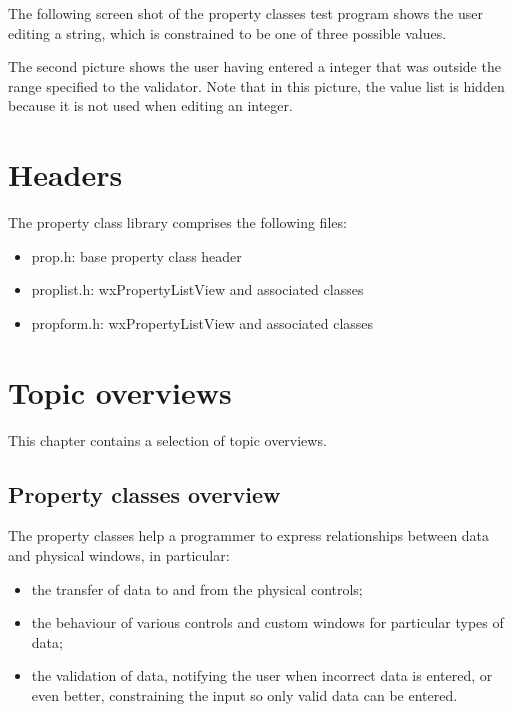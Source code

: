 The following screen shot of the property classes test program shows the
user editing a string, which is constrained to be one of three possible
values.


The second picture shows the user having entered a integer that
was outside the range specified to the validator. Note that in this picture,
the value list is hidden because it is not used when editing an integer.


\section{Headers}\label{proplistfiles}

The property class library comprises the following files:

\begin{itemize}\itemsep=0pt
\item prop.h: base property class header
\item proplist.h: wxPropertyListView and associated classes
\item propform.h: wxPropertyListView and associated classes
\end{itemize}









\section{Topic overviews}\label{proplistoverviews}

This chapter contains a selection of topic overviews.

\subsection{Property classes overview}\label{proplistpropertyoverview}

The property classes help a programmer to express relationships between
data and physical windows, in particular:

\begin{itemize}\itemsep=0pt
\item the transfer of data to and from the physical controls;
\item the behaviour of various controls and custom windows for particular
types of data;
\item the validation of data, notifying the user when incorrect data is entered,
or even better, constraining the input so only valid data can be entered.
\end{itemize}


